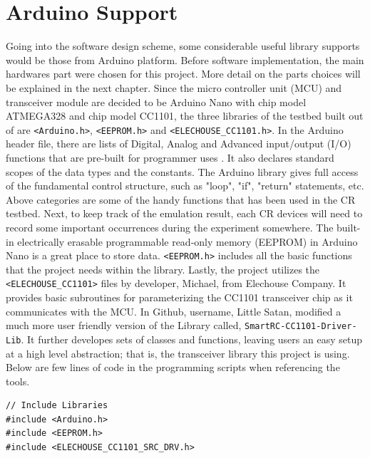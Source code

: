 \section{Arduino Support}
Going into the software design scheme, some considerable useful library supports would be those from Arduino platform. 
Before software implementation, the main hardwares part were chosen for this project. More detail on the parts choices
will be explained in the next chapter. 
Since the micro controller unit (MCU) and transceiver module are decided to be Arduino Nano with chip model ATMEGA328 and 
chip model CC1101, the three libraries of the testbed built out of are \texttt{<Arduino.h>}, \texttt{<EEPROM.h>} and \texttt{<ELECHOUSE\_CC1101.h>}. 
In the Arduino header file, there are lists of Digital, Analog and Advanced input/output (I/O) functions that are pre-built
for programmer uses \cite{arduino_reference}. It also declares standard scopes of the data types and the constants.
The Arduino library gives full access of the fundamental control structure, such as "loop", "if", "return" statements,
etc. Above categories are some of the handy functions that has been used in the CR testbed. Next, to keep track of the 
emulation result, each CR devices will need to record some important occurrences during the experiment somewhere.
The built-in electrically erasable programmable read-only memory (EEPROM) in Arduino Nano is a great place to store data. \texttt{<EEPROM.h>} includes all the basic
functions that the project needs within the library. Lastly, the project utilizes
the \texttt{<ELECHOUSE\_CC1101>} files by developer, Michael, from Elechouse Company. It provides basic subroutines
for parameterizing the CC1101 transceiver chip as it communicates with the MCU. 
In Github, username, Little Satan, modified a much more user friendly version of the Library called, 
\texttt{SmartRC-CC1101-Driver-Lib}. It further developes sets of classes and functions, leaving users an easy setup
at a high level abstraction; that is, the transceiver library this project is using. Below are few lines of code in 
the programming scripts when referencing the tools.
\newline
\begin{lstlisting}
// Include Libraries
#include <Arduino.h>
#include <EEPROM.h>
#include <ELECHOUSE_CC1101_SRC_DRV.h>
\end{lstlisting}

